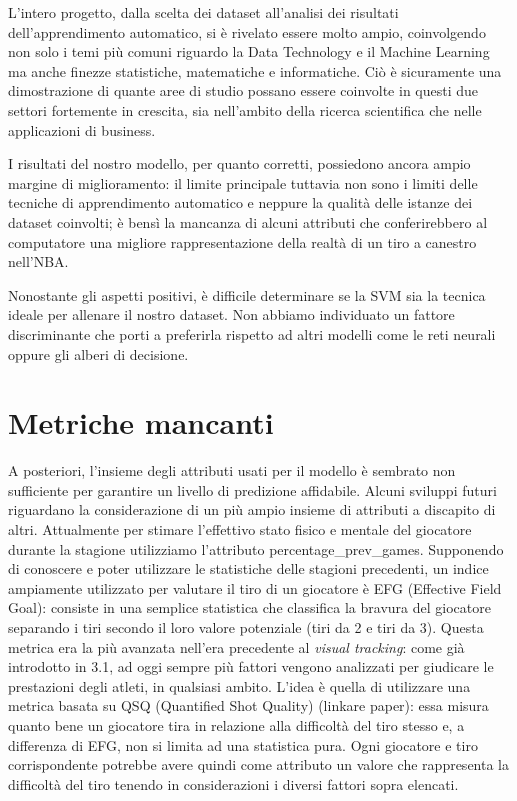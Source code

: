 L'intero progetto, dalla scelta dei dataset all'analisi dei risultati dell'apprendimento automatico, si è rivelato essere molto ampio, coinvolgendo non solo i temi più comuni riguardo la Data Technology e il Machine Learning ma anche finezze statistiche, matematiche e informatiche. Ciò è sicuramente una dimostrazione di quante aree di studio possano essere coinvolte in questi due settori fortemente in crescita, sia nell'ambito della ricerca scientifica che nelle applicazioni di business.
\par
I risultati del nostro modello, per quanto corretti, possiedono ancora ampio margine di miglioramento: il limite principale tuttavia non sono i limiti delle tecniche di apprendimento automatico e neppure la qualità delle istanze dei dataset coinvolti; è bensì la mancanza di alcuni attributi che conferirebbero al computatore una migliore rappresentazione della realtà di un tiro a canestro nell'NBA.
\par
Nonostante gli aspetti positivi, è difficile determinare se la SVM sia la tecnica ideale per allenare il nostro dataset. Non abbiamo individuato un fattore discriminante che porti a preferirla rispetto ad altri modelli come le reti neurali oppure gli alberi di decisione.

\section{Metriche mancanti}
\label{metrichemancanti}
A posteriori, l'insieme degli attributi usati per il modello è sembrato non sufficiente per garantire un livello di predizione affidabile.
Alcuni sviluppi futuri riguardano la considerazione di un più ampio insieme di attributi a discapito di altri.
Attualmente per stimare l'effettivo stato fisico e mentale del giocatore durante la stagione utilizziamo l'attributo percentage\_prev\_games. Supponendo di conoscere e poter utilizzare le statistiche delle stagioni precedenti, un indice ampiamente utilizzato per valutare il tiro di un giocatore è EFG (Effective Field Goal): consiste in una semplice statistica che classifica la bravura del giocatore separando i tiri secondo il loro valore potenziale (tiri da 2 e tiri da 3).
Questa metrica era la più avanzata nell'era precedente al \textit{visual tracking}: come già introdotto in 3.1, ad oggi sempre più fattori vengono analizzati per giudicare le prestazioni degli atleti, in qualsiasi ambito.
L'idea è quella di utilizzare una metrica basata su QSQ (Quantified Shot Quality) (linkare paper): essa misura quanto bene un giocatore tira in relazione alla difficoltà del tiro stesso e, a differenza di EFG, non si limita ad una statistica pura.
Ogni giocatore e tiro corrispondente potrebbe avere quindi come attributo un valore che rappresenta la difficoltà del tiro tenendo in considerazioni i diversi fattori sopra elencati.

